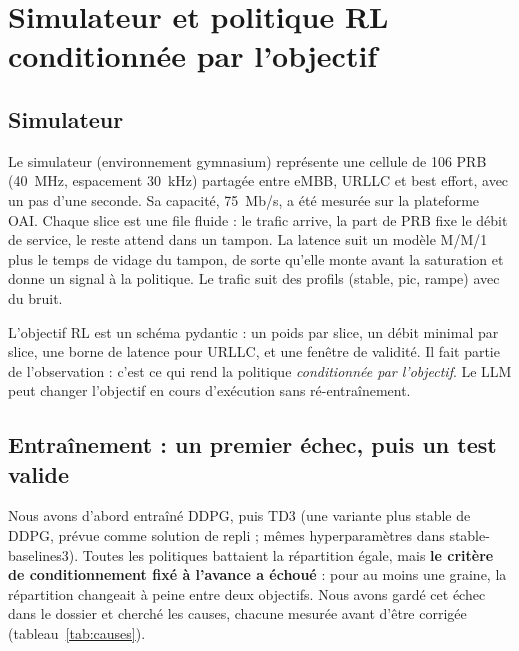 \documentclass[11pt,a4paper]{article}
\begin{document}
\section{Simulateur et politique RL conditionnée par l'objectif}

\subsection{Simulateur}

Le simulateur (environnement gymnasium) représente une cellule de 106 PRB (40~MHz,
espacement 30~kHz) partagée entre eMBB, URLLC et best effort, avec un pas d'une seconde. Sa
capacité, 75~Mb/s, a été mesurée sur la plateforme OAI. Chaque slice est une file fluide : le
trafic arrive, la part de PRB fixe le débit de service, le reste attend dans un tampon. La latence
suit un modèle M/M/1 plus le temps de vidage du tampon, de sorte qu'elle monte avant la
saturation et donne un signal à la politique. Le trafic suit des profils (stable, pic, rampe) avec
du bruit.

L'objectif RL est un schéma pydantic : un poids par slice, un débit minimal par slice, une borne
de latence pour URLLC, et une fenêtre de validité. Il fait partie de l'observation : c'est ce qui
rend la politique \emph{conditionnée par l'objectif}. Le LLM peut changer l'objectif en cours
d'exécution sans ré-entraînement.

\subsection{Entraînement : un premier échec, puis un test valide}

Nous avons d'abord entraîné DDPG, puis TD3 (une variante plus stable de DDPG, prévue comme
solution de repli ; mêmes hyperparamètres dans stable-baselines3). Toutes les politiques battaient
la répartition égale, mais \textbf{le critère de conditionnement fixé à l'avance a échoué} : pour
au moins une graine, la répartition changeait à peine entre deux objectifs. Nous avons gardé cet
échec dans le dossier et cherché les causes, chacune mesurée avant d'être corrigée
(tableau~\ref{tab:causes}).
\end{document}
